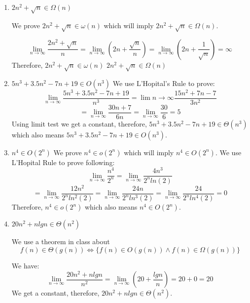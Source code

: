 \documentclass{cpsc413Solutions}
\begin{document}
\begin{problemlist}
\begin{problem}
\begin{answer}
\begin{itemize}
\end{itemize}
\end{answer}
\end{problem}


\begin{problem}
\begin{answer}
\begin{enumerate}
    \item $2n^2 + \sqrt{n} \in \Omega(n)$
    
    We prove $2n^2 + \sqrt{n} \in \omega(n)$ which will imply $2n^2 + \sqrt{n} \in \Omega(n)$.
    
    $$\lim_{n\to \infty} \frac{2n^2+\sqrt{n}}{n} = \lim_{n\to\infty} (2n + \frac{\sqrt{n}}{n})= \lim_{n\to\infty}(2n + \frac{1}{\sqrt{n}}) = \infty$$
    Therefore, $2n^2 + \sqrt{n} \in \omega(n)$ \longrightarrow $2n^2 + \sqrt{n} \in \Omega(n)$
    
    \item $5n^3 +3.5n^2 -7n +19 \in {O}(n^3)$
    We use L'Hopital's Rule to prove:
    $$\lim_{n\to\infty} \frac{5n^3 +3.5n^2 -7n +19}{n^3} = \lim_{}n\to\infty \frac{15n^2 + 7n -7}{3n^2}$$
    $$= \lim_{n\to \infty} \frac{30n+7}{6n} = \lim_{n\to\infty} \frac{30}{6}=5$$
    Using limit test we get a constant, therefore, $5n^3 +3.5n^2 -7n +19 \in \Theta(n^3)$ which also means $5n^3 +3.5n^2 -7n +19 \in {O}(n^3)$.
    
    \item $n^4 \in {O}(2^n)$
    We prove $n^4 \in {o}(2^n)$ which will imply $n^4 \in {O}(2^n)$. We use L'Hopital Rule to prove following:
    $$\lim_{n\to\infty} \frac{n^4}{2^n} = \lim_{n\to\infty} \frac{4n^3}{2^n ln(2)}$$
    $$= \lim_{n\to\infty} \frac{12n^2}{2^n ln^2(2)} = \lim_{n\to\infty} \frac{24n}{2^n ln^3(2)} = \lim_{n\to\infty} \frac{24}{2^n ln^4(2)} = 0$$
    Therefore, $n^4 \in {o}(2^n)$ which also means $n^4 \in {O}(2^n)$.
    
    \item $20n^2 + nlgn \in \Theta(n^2)$
    
    We use a theorem in class about \[f(n) \in \Theta(g(n)) \Leftrightarrow  \{f(n) \in O(g(n)) \land f(n) \in \Omega(g(n))\}\]
    
    We have:
    $$ \lim_{n\to\infty} \frac{20n^2 + nlgn}{n^2} = \lim_{n\to\infty} (20 + \frac{lgn}{n}) = 20 + 0 = 20$$
    We get a constant, therefore, $20n^2 + nlgn \in \Theta(n^2)$.
    
\end{enumerate}
\end{answer}
\end{problem}



\end{problemlist}
\end{document}
